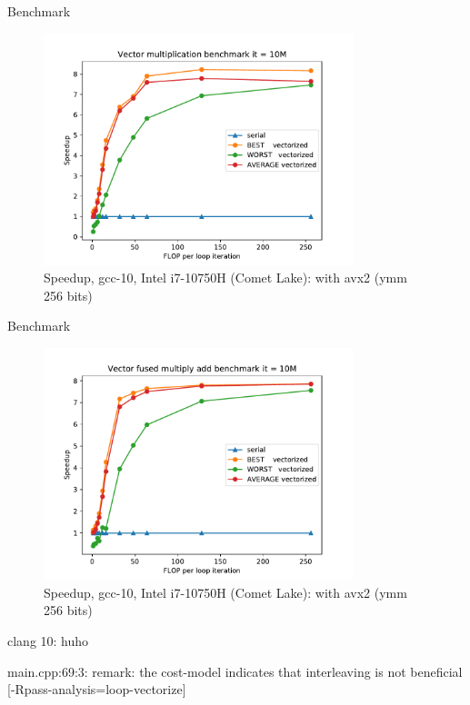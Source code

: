 \documentclass{beamer}
\begin{document}
\begin{frame}{Benchmark}
\begin{figure}
    \includegraphics[width=9cm, center]{gcc/MUL/speedup_vec_vs_ser_vector_op.pdf}
    \caption{Speedup, gcc-10, Intel i7-10750H (Comet Lake): with avx2 (ymm 256 bits)}
    \label{fig:speedup}
\end{figure}
\end{frame}

\begin{frame}{Benchmark}
\begin{figure}
    \includegraphics[width=9cm, center]{gcc/FMA/speedup_vec_vs_ser_vector_op.pdf}
    \caption{Speedup, gcc-10, Intel i7-10750H (Comet Lake): with avx2 (ymm 256 bits)}
    \label{fig:speedup}
\end{figure}
\end{frame}

\begin{frame}{clang 10: huho}
\begin{center}
        main.cpp:69:3: remark: the cost-model indicates that interleaving is not beneficial [-Rpass-analysis=loop-vectorize]
\end{center}
\end{frame}
\end{document}
